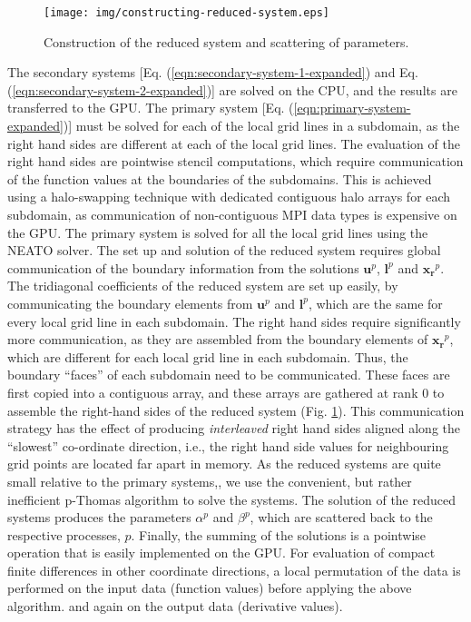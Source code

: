 \begin{figure}[h]
\begin{center}
\texttt{[image: img/constructing-reduced-system.eps]}
\caption{Construction of the reduced system and scattering of parameters.}
\label{fig:constructing-reduced-system}
\end{center}
\end{figure}
%
The secondary systems
[Eq. (\ref{eqn:secondary-system-1-expanded}) and
 Eq. (\ref{eqn:secondary-system-2-expanded})]
are solved on the CPU,
and the results are transferred to the GPU.
%
The primary system [Eq. (\ref{eqn:primary-system-expanded})] must be solved
for each of the local grid lines in a subdomain,
as the right hand sides are different at each of the local grid lines. 
The evaluation of the right hand sides are
pointwise stencil computations,
which require communication of the
function values at the boundaries of the subdomains.
This is achieved using a halo-swapping technique
with dedicated contiguous halo arrays for each subdomain,
as communication of non-contiguous MPI
data types is expensive on the GPU.
The primary system is solved for all the local grid lines
using the NEATO solver.
%
The set up and solution of the reduced system
requires global communication of the boundary information
from the solutions $\bm{u}^p$, $\bm{l}^p$ and $\bm{x_r}^p$.
The tridiagonal coefficients of the reduced system
are set up easily,
by communicating the boundary elements from
$\bm{u}^p$ and $\bm{l}^p$,
which are the same for every local grid line in each subdomain.
The right hand sides require significantly more communication,
as they are assembled from the boundary elements of $\bm{x_r}^p$,
which are different for each local grid line in each subdomain.
Thus, the boundary ``faces'' of each subdomain need to be communicated.
These faces are first copied into a contiguous array,
and these arrays are gathered at rank 0
to assemble the right-hand sides of the reduced system
(Fig. \ref{fig:constructing-reduced-system}).
This communication strategy has the effect of
producing \emph{interleaved} right hand sides
aligned along the ``slowest'' co-ordinate direction, i.e.,
the right hand side values for neighbouring grid points
are located far apart in memory.
As the reduced systems are quite small relative to the primary systems,,
we use the convenient, but rather inefficient
p-Thomas algorithm to solve the systems.
The solution of the reduced systems produces the parameters
$\alpha^p$ and $\beta^p$,
which are scattered back to the respective processes, $p$.
%
Finally, the summing of the solutions
is a pointwise operation that is easily implemented
on the GPU.
For evaluation of compact finite differences in other
coordinate directions,
a local permutation of the data is performed on the input data
(function values)
before applying the above algorithm.
and again on the output data
(derivative values).

